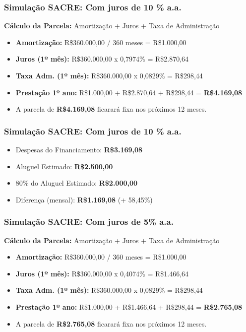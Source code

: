\begin{frame}[c]\frametitle{Simulação SACRE: Com juros de 10 \% a.a.}
  \textbf{Cálculo da Parcela:} Amortização + Juros + Taxa de Administração
  \begin{itemize}
    \item \textbf{Amortização:} R\$360.000,00 / 360 meses = R\$1.000,00
    \item \textbf{Juros (1º mês):} R\$360.000,00 x 0,7974\% = R\$2.870,64
    \item \textbf{Taxa Adm. (1º mês):} R\$360.000,00 x 0,0829\% = R\$298,44
    \item \textbf{Prestação 1º ano:} R\$1.000,00 + R\$2.870,64 + R\$298,44 = \textbf{R\$4.169,08}
  \end{itemize}


  \begin{itemize}
    \item A parcela de \textbf{R\$4.169,08} ficarará fixa nos próximos 12 meses.
  \end{itemize}
\end{frame}

\begin{frame}[c]\frametitle{Simulação SACRE: Com juros de 10 \% a.a.}
  \begin{itemize}
    \item {Despesas do Financiamento:} \textbf{R\$3.169,08}
    \item {Aluguel Estimado:} \textbf{R\$2.500,00}
    \item {80\% do Aluguel Estimado:} \textbf{R\$2.000,00}
    \item {Diferença (mensal):} \textbf{R\$1.169,08} (+ 58,45\%)
  \end{itemize}
\end{frame}

\begin{frame}[c]\frametitle{Simulação SACRE: Com juros de 5\% a.a.}
  \textbf{Cálculo da Parcela:} Amortização + Juros + Taxa de Administração
  \begin{itemize}
    \item \textbf{Amortização:} R\$360.000,00 / 360 meses = R\$1.000,00
    \item \textbf{Juros (1º mês):} R\$360.000,00 x 0,4074\% = R\$1.466,64
    \item \textbf{Taxa Adm. (1º mês):} R\$360.000,00 x 0,0829\% = R\$298,44
    \item \textbf{Prestação 1º ano:} R\$1.000,00 + R\$1.466,64 + R\$298,44 = \textbf{R\$2.765,08}
  \end{itemize}


  \begin{itemize}
    \item A parcela de \textbf{R\$2.765,08} ficarará fixa nos próximos 12 meses.
  \end{itemize}
\end{frame}

